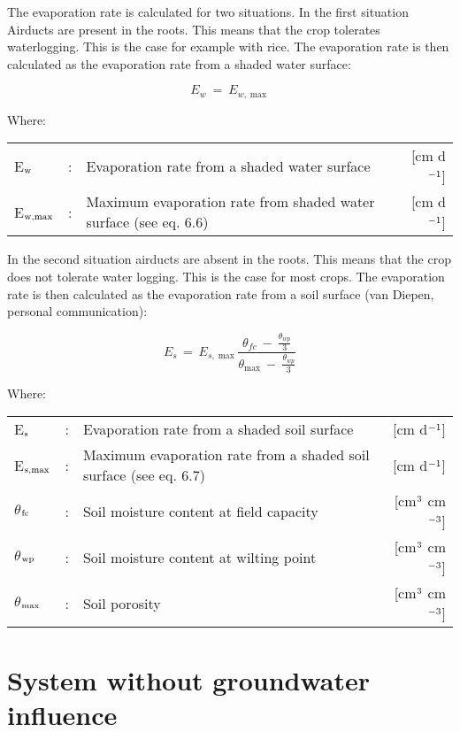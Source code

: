 The evaporation rate is calculated for two situations. In the first situation
Airducts are present in the roots. This means that the crop tolerates waterlog\-ging. This
is the case for example with rice. The evaporation rate is then calculated as the 
evaporation rate from a shaded water surface:

\begin{equation}
E _{w} ~=~ E _{w, \max } 
\end{equation}

Where:\\[5pt]
\begin{tabularx}{\textwidth}{llXr}
    E$_{{\rm w}}$ &:& Evaporation rate from a shaded water surface & [cm d$^{{\rm -1}}$]\\
    E$_{{\rm w,max}}$ &:& Maximum evaporation rate from shaded 
    water surface (see eq. 6.6) & [cm d$^{{\rm -1}}$]\\
\end{tabularx}

In the second situation airducts are absent in the roots. This means that the crop does
not tolerate water
logging. This is the case for most crops. The evaporation rate is then calculated as the
evaporation rate from a soil surface (van Diepen, personal communication):  

\begin{equation}
E _{s~} =~ E _{s,\max } {\frac{ \theta  _{fc} ~-~ {{\frac{\theta  _{wp} }{3}}} }{\theta  _{\max } ~-~{{\frac{\theta  _{wp} }{3}}} }}
\end{equation}

Where:\\[5pt]
\begin{tabularx}{\textwidth}{llXr}
    E$_{{\rm s}}$ &:& Evaporation rate from a shaded soil surface & [cm d$^{{\rm -1}}$]\\
    E$_{{\rm s,max}}$ &:& Maximum evaporation rate from a shaded
    soil surface (see eq. 6.7) & [cm d$^{{\rm -1}}$]\\
    $\theta$$_{{\rm fc}}$ &:& Soil moisture content at field capacity & [cm$^{{\rm 3}}$ cm$^{{\rm -3}}$]\\
    $\theta$$_{{\rm wp}}$ &:& Soil moisture content at wilting point & [cm$^{{\rm 3}}$ cm$^{{\rm -3}}$]\\
    $\theta$$_{{\rm max}}$ &:& Soil porosity & [cm$^{{\rm 3}}$ cm$^{{\rm -3}}$]\\
\end{tabularx}

\section{System without groundwater influence}

